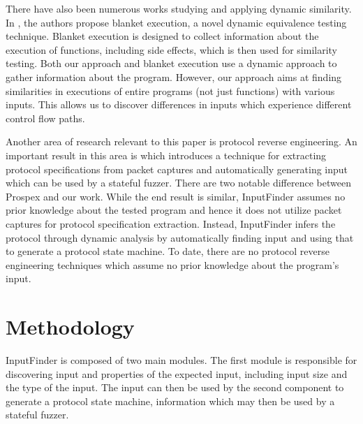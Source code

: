 \documentclass{acm_proc_article-sp}
\def \tool {InputFinder}
\begin{document}
There have also been numerous works studying and applying dynamic similarity.
In \cite{blanketexec}, the authors propose blanket execution, a novel dynamic equivalence testing technique.
Blanket execution is designed to collect information about the execution of functions, including side effects, which is then used for similarity testing.
Both our approach and blanket execution use a dynamic approach to gather information about the program.
However, our approach aims at finding similarities in executions of entire programs (not just functions) with various inputs.
This allows us to discover differences in inputs which experience different control flow paths.

Another area of research relevant to this paper is protocol reverse engineering.
An important result in this area is \cite{prospex} which introduces a technique for extracting protocol specifications from packet captures and automatically generating input which can be used by a stateful fuzzer.
There are two notable difference between Prospex and our work.
While the end result is similar, \tool{} assumes no prior knowledge about the tested program and hence it does not utilize packet captures for protocol specification extraction.
Instead, \tool{} infers the protocol through dynamic analysis by automatically finding input and using that to generate a protocol state machine.
To date, there are no protocol reverse engineering techniques which assume no prior knowledge about the program's input.

\section{Methodology} \label{methodology}

\tool{} is composed of two main modules.
The first module is responsible for discovering input and properties of the expected input, including input size and the type of the input.
The input can then be used by the second component to generate a protocol state machine, information which may then be used by a stateful fuzzer.
\end{document}
